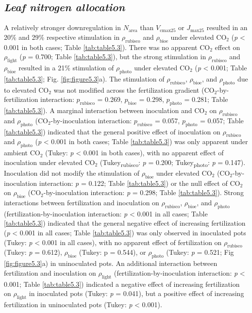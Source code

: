 \subsection{\textit{Leaf nitrogen allocation}}
A relatively stronger downregulation in $N_\mathrm{area}$ than $V_\mathrm{cmax25}$ or $J_\mathrm{max25}$ resulted in an 20\% and 29\% respective stimulation in $\rho_\mathrm{rubisco}$ and $\rho_\mathrm{bioe}$ under elevated CO$_2$ (\textit{p} < 0.001 in both cases; Table \ref{tab:table5.3}). There was no apparent CO$_2$ effect on $\rho_\mathrm{light}$ (\textit{p} = 0.700; Table \ref{tab:table5.3}), but the strong stimulation in $\rho_\mathrm{rubisco}$ and $\rho_\mathrm{bioe}$ resulted in a 21\% stimulation of $\rho_\mathrm{photo}$ under elevated CO$_2$ (\textit{p} < 0.001; Table \ref{tab:table5.3}; Fig. \ref{fig:figure5.3}a). The stimulation of $\rho_\mathrm{rubisco}$, $\rho_\mathrm{bioe}$, and $\rho_\mathrm{photo}$ due to elevated CO$_2$ was not modified across the fertilization gradient (CO$_2$-by-fertilization interaction: $p_\mathrm{rubisco}$ = 0.269, $p_\mathrm{bioe}$ = 0.298, $p_\mathrm{photo}$ = 0.281; Table \ref{tab:table5.3}). A marginal interaction between inoculation and CO$_2$ on $\rho_\mathrm{rubisco}$ and $\rho_\mathrm{photo}$ (CO$_2$-by-inoculation interaction: $p_\mathrm{rubisco}$ = 0.057, $p_\mathrm{photo}$ = 0.057; Table \ref{tab:table5.3}) indicated that the general positive effect of inoculation on $\rho_\mathrm{rubisco}$ and $\rho_\mathrm{photo}$ (\textit{p} < 0.001 in both cases; Table \ref{tab:table5.3}) was only apparent under ambient CO$_2$ (Tukey: \textit{p} < 0.001 in both cases), with no apparent effect of inoculation under elevated CO$_2$ (Tukey\textsubscript{rubisco}: \textit{p} = 0.200; Tukey\textsubscript{photo}: \textit{p} = 0.147). Inoculation did not modify the stimulation of $\rho_\mathrm{bioe}$ under elevated CO$_2$ (CO$_2$-by-inoculation interaction: \textit{p} = 0.122; Table \ref{tab:table5.3}) or the null effect of CO$_2$ on $\rho_\mathrm{bioe}$ (CO$_2$-by-inoculation interaction: \textit{p} = 0.298; Table \ref{tab:table5.3}). Strong interactions between fertilization and inoculation on $\rho_\mathrm{rubisco}$, $\rho_\mathrm{bioe}$, and $\rho_\mathrm{photo}$ (fertilization-by-inoculation interaction: \textit{p} < 0.001 in all cases; Table \ref{tab:table5.3}) indicated that the general negative effect of increasing fertilization (\textit{p} < 0.001 in all cases; Table \ref{tab:table5.3}) was only observed in inoculated pots (Tukey: \textit{p} < 0.001 in all cases), with no apparent effect of fertilization on $\rho_\mathrm{rubisco}$ (Tukey: \textit{p} = 0.612), $\rho_\mathrm{bioe}$ (Tukey: p = 0.544), or $\rho_\mathrm{photo}$ (Tukey: \textit{p} = 0.521; Fig \ref{fig:figure5.3}a) in uninoculated pots. An additional interaction between fertilization and inoculation on $\rho_\mathrm{light}$ (fertilization-by-inoculation interaction: \textit{p} < 0.001; Table \ref{tab:table5.3}) indicated a negative effect of increasing fertilization on $\rho_\mathrm{light}$ in inoculated pots (Tukey: \textit{p} = 0.041), but a positive effect of increasing fertilization in uninoculated pots (Tukey: \textit{p} < 0.001).

